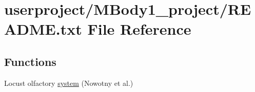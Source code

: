 \hypertarget{userproject_2MBody1__project_2README_8txt}{\section{userproject/\+M\+Body1\+\_\+project/\+R\+E\+A\+D\+M\+E.txt File Reference}
\label{userproject_2MBody1__project_2README_8txt}
}
\subsection*{Functions}
\begin{DoxyCompactItemize}
\item 
Locust olfactory \hyperlink{userproject_2MBody1__project_2README_8txt_a7cb34d23674f5961d3ccc614a026345c}{system} (Nowotny et al.)
\end{DoxyCompactItemize}
